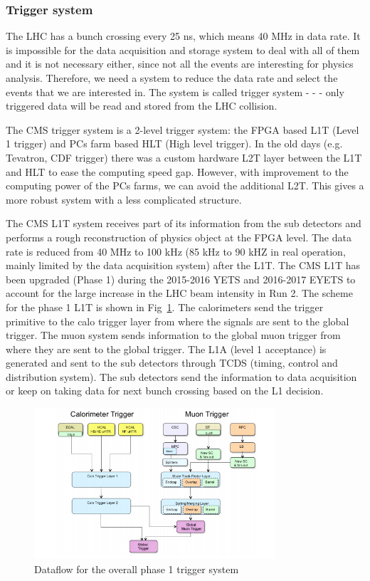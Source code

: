 \subsubsection{Trigger system}

The LHC has a bunch crossing every 25 ns, which means 40 MHz in data rate. It is impossible for the data acquisition and storage system to deal with all of them and it is not necessary either, since not all the events are interesting for physics analysis. Therefore, we need a system to reduce the data rate and select the events that we are interested in. The system is called trigger system - - - only triggered data will be read and stored from the LHC collision. 

The CMS trigger system is a 2-level trigger system: the FPGA based L1T (Level 1 trigger) and PCs farm based HLT (High level trigger). In the old days (e.g. Tevatron, CDF trigger) there was a custom hardware L2T layer between the L1T and HLT to ease the computing speed gap. However, with improvement to the computing power of the PCs farms, we can avoid the additional L2T. This gives a more robust system with a less complicated structure. 

The CMS L1T system receives part of its information from the sub detectors and performs a rough reconstruction of physics object at the FPGA level. The data rate is reduced from 40 MHz to 100 kHz (85 kHz to 90 kHZ in real operation, mainly limited by the data acquisition system) after the L1T. The CMS L1T has been upgraded (Phase 1) during the 2015-2016 YETS and 2016-2017 EYETS to account for the large increase in the LHC beam intensity in Run 2. The scheme for the phase 1 L1T is shown in Fig~\ref{fig:c3cmsl1scheme}. The calorimeters send the trigger primitive to the calo trigger layer from where the signals are sent to the global trigger. The muon system sends information to the global muon trigger from where they are sent to the global trigger. The L1A (level 1 acceptance) is generated and sent to the sub detectors through TCDS (timing, control and distribution system). The sub detectors send the information to data acquisition or keep on taking data for next bunch crossing based on the L1 decision. 

\begin{figure}[htbp]
 \begin{center}
  \includegraphics[width=0.8\textwidth]{figures/c3/c3_cms_l1scheme.png}
 \end{center}
 \caption{Dataflow for the overall phase 1 trigger system}
 \label{fig:c3cmsl1scheme}
\end{figure}

